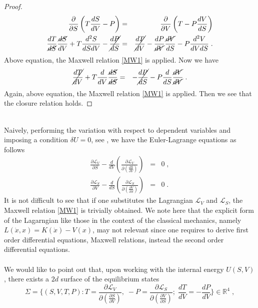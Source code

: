 \documentclass[12pt]{article}
\numberwithin{equation}{section}
\theoremstyle{remark}
\theoremstyle{definition}
\newcommand{\nn}{\nonumber}
\begin{document}
\begin{proof} 
\begin{eqnarray}
    \frac{\partial}{\partial S}\left(T\frac{dS}{dV}-P\right)&=&\frac{\partial}{\partial V}\left(T-P\frac{dV}{dS}\right)\nn\\
    \frac{dT}{\cancel{dS}}\frac{\cancel{dS}}{dV}+T\frac{d^2S}{dSdV}-\cancel{\frac{dP}{dS}}&=&\cancel{\frac{dT}{dV}}-\frac{dP}{\cancel{dV}}\frac{\cancel{dV}}{dS}-P\frac{d^2V}{dVdS}\;.
\end{eqnarray}
Above equation, the Maxwell relation \eqref{MW1} is applied. Now we have
\begin{eqnarray}
    \cancel{\frac{dT}{dV}}+T\frac{d}{dV}\frac{\cancel{dS}}{\cancel{dS}}&=&-\cancel{\frac{dP}{dS}}-P\frac{d}{dS}\frac{\cancel{dV}}{\cancel{dV}}\;.
\end{eqnarray}
Again, above equation, the Maxwell relation \eqref{MW1} is applied. Then we see that the closure relation holds.
\end{proof}
\phantom{d}
\\
Naively, performing the variation with respect to dependent variables and imposing a condition $\delta U=0$, see \cite{Yookong1,Yookong2}, we have the Euler-Lagrange equations as follows
\begin{eqnarray}
    \frac{\partial \mathcal{L}_V}{\partial S}-\frac{d}{dV}\left(\frac{\partial \mathcal{L}_V}{\partial\left(\frac{\partial S}{\partial V}\right)}\right)&=&0\;,\\
    \frac{\partial \mathcal{L}_S}{\partial V}-\frac{d}{dS}\left(\frac{\partial \mathcal{L}_S}{\partial\left(\frac{\partial V}{\partial S}\right)}\right)&=&0\;.
\end{eqnarray}
It is not difficult to see that if one substitutes the Lagrangian $\mathcal{L}_V$ and $\mathcal{L}_S$, the Maxwell relation \eqref{MW1} is trivially obtained. We note here that the explicit form of the Lagarngian like those in the context of the classical mechanics, namely $L(\dot x,x)=K(\dot x)-V(x)$, may not relevant since one requires to derive first order differential equations, Maxwell relations, instead the second order differential equations.
\\
\\
We would like to point out that, upon working with the internal energy $U(S,V)$, there exists a $2d$ surface of the equilibrium states
\begin{equation}
    \Sigma=\Big\{(S,V,T,P): T=\frac{\partial \mathcal{L}_V}{\partial \left(\frac{\partial S}{\partial V}\right)}, \;-P=\frac{\partial \mathcal{L}_S}{\partial \left(\frac{\partial V}{\partial S}\right)};\; \frac{dT}{dV}=-\frac{dP}{dV}\Big\} \in \mathbb{R}^4\;,\nn
\end{equation}
\end{document}
